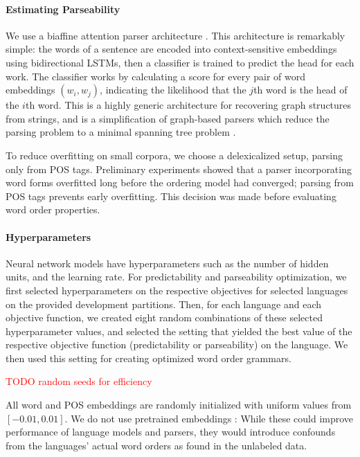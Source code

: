 \documentclass[10pt,twoside,lineno]{article}
\begin{document}
\paragraph{Estimating Parseability}
We use a biaffine attention parser architecture \citep{kiperwasser2016simple,zhang2017dependency,dozat2017stanford}. This architecture is remarkably simple: the words of a sentence are encoded into context-sensitive embeddings using bidirectional LSTMs, then a classifier is trained to predict the head for each work. The classifier works by calculating a score for every pair of word embeddings $(w_i, w_j)$, indicating the likelihood that the $j$th word is the head of the $i$th word. This is a highly generic architecture for recovering graph structures from strings, and is a simplification of graph-based parsers which reduce the parsing problem to a minimal spanning tree problem \citep{mcdonald2005nonprojective}.

To reduce overfitting on small corpora, we choose a delexicalized setup, parsing only from POS tags. Preliminary experiments showed that a parser incorporating word forms overfitted long before the ordering model had converged; parsing from POS tags prevents early overfitting.
This decision was made before evaluating word order properties.

\paragraph{Hyperparameters}


Neural network models have hyperparameters such as the number of hidden units, and the learning rate. 
For predictability and parseability optimization, we first selected hyperparameters on the respective objectives for selected languages on the provided development partitions.
Then, for each language and each objective function, we created eight random combinations of these selected hyperparameter values, and selected the setting that yielded the best value of the respective objective function (predictability or parseability) on the language. We then used this setting for creating optimized word order grammars. 

\textcolor{red}{TODO random seeds for efficiency}



All word and POS embeddings are randomly initialized with uniform values from $[-0.01, 0.01]$.
We do not use pretrained embeddings \citep{peters2018deep}: While these could improve performance of language models and parsers, they would introduce confounds from the languages' actual word orders as found in the unlabeled data.
\end{document}
